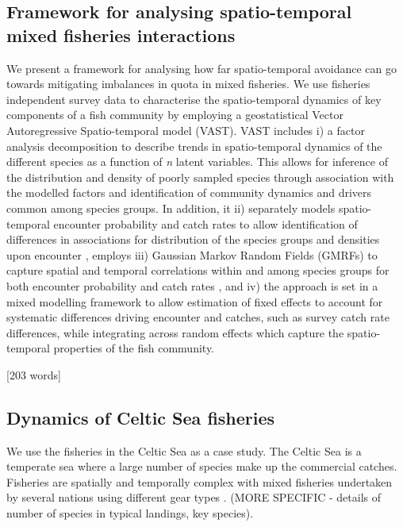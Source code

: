 \documentclass{nature}
\begin{document}
\begin{linenumbers}
[577 words]

\subsection{Framework for analysing spatio-temporal mixed fisheries
	interactions}

We present a framework for analysing how far spatio-temporal avoidance can go
towards mitigating imbalances in quota in mixed fisheries. We use fisheries
independent survey data to characterise the spatio-temporal dynamics of key
components of a fish community by employing a geostatistical Vector
Autoregressive Spatio-temporal model (VAST). VAST includes i) a factor analysis
decomposition to describe trends in spatio-temporal dynamics of the different
species as a function of \textit{n} latent variables\cite{Thorson2015}. This
allows for inference of the distribution and density of poorly sampled species
through association with the modelled factors and identification of community
dynamics and drivers common among species groups. In addition, it ii)
separately models spatio-temporal encounter probability and catch rates to
allow identification of differences in associations for distribution of the
species groups and densities upon encounter \cite{Thorson2015a}, employs iii)
Gaussian Markov Random Fields (GMRFs) to capture spatial and temporal
correlations within and among species groups for both encounter probability and
catch rates \cite{Thorson2013}, and iv) the approach is set in a mixed
modelling framework to allow estimation of fixed effects to account for
systematic differences driving encounter and catches, such as survey catch rate
differences, while integrating across random effects which capture the
spatio-temporal properties of the fish community.

[203 words]

\subsection{Dynamics of Celtic Sea fisheries}

We use the fisheries in the Celtic Sea as a case study. The Celtic Sea is a
temperate sea where a large number of species make up the commercial catches.
Fisheries are spatially and temporally complex with mixed fisheries undertaken
by several nations using different gear types \cite{Ellis2000, Gerritsen2012}.
(MORE SPECIFIC - details of number of species in typical landings, key
species).


\end{linenumbers}
\end{document}
